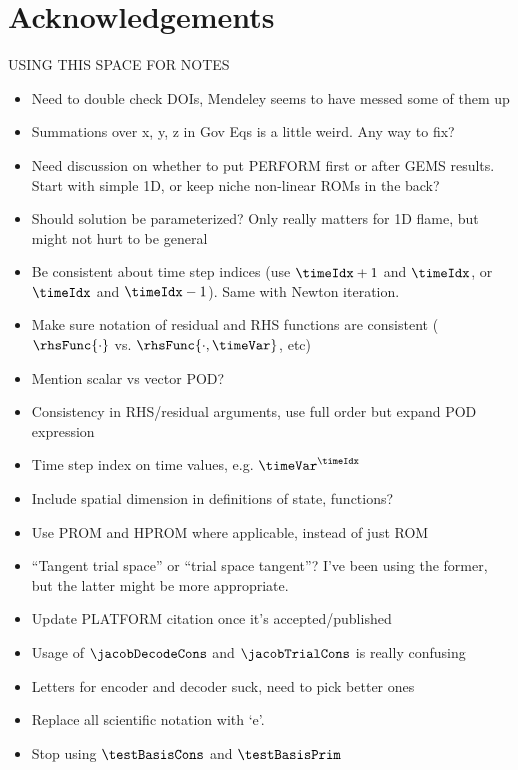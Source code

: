 \chapter{Acknowledgements}

{\color{red}
USING THIS SPACE FOR NOTES
\begin{itemize}
	\item Need to double check DOIs, Mendeley seems to have messed some of them up
	\item Summations over x, y, z in Gov Eqs is a little weird. Any way to fix?
	\item Need discussion on whether to put PERFORM first or after GEMS results. Start with simple 1D, or keep niche non-linear ROMs in the back?
	\item Should solution be parameterized? Only really matters for 1D flame, but might not hurt to be general
	\item Be consistent about time step indices (use $\timeIdx + 1$ and $\timeIdx$, or $\timeIdx$ and $\timeIdx - 1$). Same with Newton iteration.
	\item Make sure notation of residual and RHS functions are consistent ($\rhsFunc{\cdot}$ vs. $\rhsFunc{\cdot, \timeVar}$, etc)
	\item Mention scalar vs vector POD?
	\item Consistency in RHS/residual arguments, use full order but expand POD expression
	\item Time step index on time values, e.g. $\timeVar^{\timeIdx}$
	\item Include spatial dimension in definitions of state, functions?
	\item Use PROM and HPROM where applicable, instead of just ROM
	\item ``Tangent trial space'' or ``trial space tangent''? I've been using the former, but the latter might be more appropriate.
	\item Update PLATFORM citation once it's accepted/published
	\item Usage of $\jacobDecodeCons$ and $\jacobTrialCons$ is really confusing
	\item Letters for encoder and decoder suck, need to pick better ones
	\item Replace all scientific notation with `e'.
	\item Stop using $\testBasisCons$ and $\testBasisPrim$
\end{itemize}

}